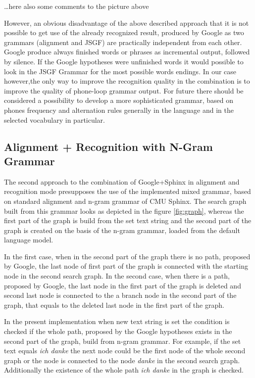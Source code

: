 \ldots here also some comments to the picture above

However, an obvious disadvantage of the above described approach that it is not 
possible to get use of the already recognized result, produced by Google as two
grammars (alignment and JSGF) are practically independent from each other.
Google produce always finished words or phrases as incremental output, followed
by silence. If the Google hypotheses were unfinished words it would possible to
look in the JSGF Grammar for the most possible words endings. In our case
however,the only way to improve the recognition quality in the combination is to improve
the quality of phone-loop grammar output. For future there should be considered a
possibility to develop a more sophisticated grammar, based on phones
frequency and alternation rules generally in the language and in the selected
vocabulary in particular. 
\subsection {Alignment + Recognition with N-Gram Grammar}
The second approach to the combination of Google+Sphinx in alignment
and recognition mode presupposes the use of the implemented mixed grammar, based
on standard alignment and n-gram grammar of CMU Sphinx.  The search graph built
from this grammar looks as depicted in the figure \ref{fig:graph}, whereas the
first part of the graph is build from the set text string and the second part of
the graph is created on the basis of the n-gram grammar, loaded from the default
language model. 

In the first case, when in the second part of the graph there is no path,
proposed by Google, the last node of first part of the graph is connected with the
starting node in the second search graph. In the second case, when there is a
path, proposed by Google, the last node in the first part of the graph  is
deleted and second last node is connected to the a branch node in the second
part of the graph, that equals to the deleted last node in the first part of
the graph. 

In the present implementation when new text string is set  the
condition is checked if the whole path, proposed by the Google hypotheses exists in the second part of the
graph, build from n-gram grammar. For  example, if the set text equals \textit
{ich danke} the next node could be the first node of the whole second graph or the node 
 is connected to the node \textit {danke} in the second search graph.
Additionally the existence of the whole path  \textit
{ich danke} in the graph is checked. 

